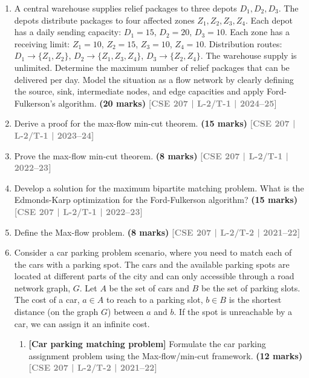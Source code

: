 \documentclass[12pt,a3paper]{article}
\newcommand{\yr}[1]{\hfill\textcolor{gray}{\small\textbf{[#1]}}}
\newcommand{\mk}[1]{\textcolor{orange!70!black}{\small\textbf{(#1 marks)}}}
\begin{document}
\begin{enumerate}

\item A central warehouse supplies relief packages to three depots $D_1, D_2, D_3$. The depots distribute packages to four affected zones $Z_1, Z_2, Z_3, Z_4$. Each depot has a daily sending capacity: $D_1 = 15$, $D_2 = 20$, $D_3 = 10$. Each zone has a receiving limit: $Z_1 = 10$, $Z_2 = 15$, $Z_3 = 10$, $Z_4 = 10$. Distribution routes: $D_1 \to \{Z_1, Z_2\}$, $D_2 \to \{Z_1, Z_3, Z_4\}$, $D_3 \to \{Z_2, Z_4\}$. The warehouse supply is unlimited. Determine the maximum number of relief packages that can be delivered per day. Model the situation as a flow network by clearly defining the source, sink, intermediate nodes, and edge capacities and apply Ford-Fulkerson's algorithm.
\mk{20} \yr{CSE 207 | L-2/T-1 | 2024--25}

\item Derive a proof for the max-flow min-cut theorem.
\mk{15} \yr{CSE 207 | L-2/T-1 | 2023--24}

\item Prove the max-flow min-cut theorem.
\mk{8} \yr{CSE 207 | L-2/T-1 | 2022--23}

\item Develop a solution for the maximum bipartite matching problem. What is the Edmonds-Karp optimization for the Ford-Fulkerson algorithm?
\mk{15} \yr{CSE 207 | L-2/T-1 | 2022--23}

\item Define the Max-flow problem.
\mk{8} \yr{CSE 207 | L-2/T-2 | 2021--22}

\item Consider a car parking problem scenario, where you need to match each of the cars with a parking spot. The cars and the available parking spots are located at different parts of the city and can only accessible through a road network graph, $G$. Let $A$ be the set of cars and $B$ be the set of parking slots. The cost of a car, $a \in A$ to reach to a parking slot, $b \in B$ is the shortest distance (on the graph $G$) between $a$ and $b$. If the spot is unreachable by a car, we can assign it an infinite cost.
\begin{enumerate}
\item \textbf{[Car parking matching problem]} Formulate the car parking assignment problem using the Max-flow/min-cut framework.
\mk{12} \yr{CSE 207 | L-2/T-2 | 2021--22}


\end{enumerate}
\end{enumerate}
\end{document}

